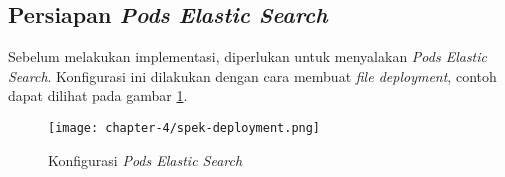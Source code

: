 \subsection{Persiapan \textit{Pods Elastic Search}}

Sebelum melakukan implementasi, diperlukan untuk menyalakan \textit{Pods Elastic Search}. Konfigurasi ini dilakukan dengan cara membuat \textit{file deployment}, contoh dapat dilihat pada gambar \ref{fig:spek-deployment}.

\begin{figure}[h]
    \centering
    \texttt{[image: chapter-4/spek-deployment.png]}
    \caption{Konfigurasi \textit{Pods Elastic Search}}
    \label{fig:spek-deployment}
\end{figure}